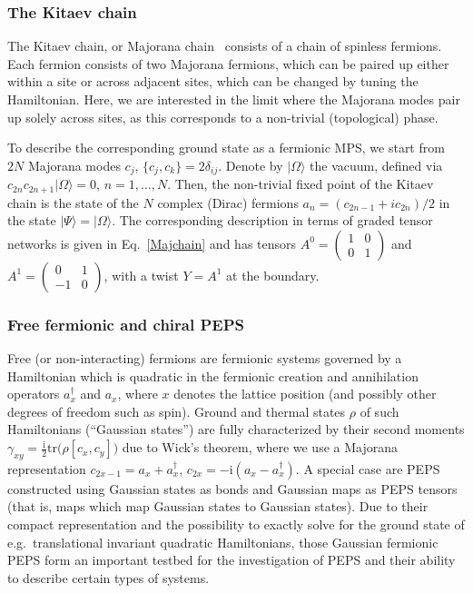 \documentclass[rmp,aps,reprint,superscriptaddress,nobalancelastpage]{revtex4-1}
\newcommand{\ket}[1]{\vert#1\rangle}
\begin{document}
\subsubsection{The Kitaev chain}

The Kitaev chain, or Majorana chain~\cite{kitaev:majorana-chain} consists of a chain of spinless fermions. Each fermion consists of two Majorana fermions, which can be paired up either within a site or across adjacent sites, which can be changed by tuning the Hamiltonian. Here, we are interested in the limit where the Majorana modes pair up solely across sites, as this corresponds to a non-trivial (topological) phase.

To describe the corresponding ground state as a fermionic MPS, we start from $2N$ Majorana modes $c_j$, $\{c_j,c_k\}=2\delta_{ij}$.
Denote by $\ket\Omega$ the vacuum, defined via $c_{2n}c_{2n+1}\ket{\Omega}=0$, $n=1,\dots,N$. Then, the non-trivial fixed point of the Kitaev chain is the state of the $N$ complex (Dirac) fermions $a_n=(c_{2n-1}+ic_{2n})/2$ in the state $\ket\Psi=\ket\Omega$. The corresponding description in terms of graded tensor networks is given in Eq.~\eqref{Majchain} and has tensors \cite{bultinck:fermionic-mps-phases} $A^0=\left(\begin{smallmatrix}1&0\\0&1\end{smallmatrix}\right)$ and
$A^1=\left(\begin{smallmatrix}0&1\\-1&0\end{smallmatrix}\right)$, with a twist $Y=A^1$ at the boundary.



\subsubsection{Free fermionic and chiral PEPS}

Free (or non-interacting) fermions are fermionic systems governed by a Hamiltonian which is quadratic in the fermionic creation and annihilation operators $a^\dagger_x$ and $a_x$, where $x$ denotes the lattice position (and possibly other degrees of freedom such as spin). Ground and thermal states $\rho$ of such Hamiltonians (``Gaussian states'') are fully characterized by their second moments $\gamma_{xy} = \tfrac{\mathrm{i}}{2}\mathrm{tr}\big(\rho [c_x,c_y]\big)$ due to Wick's theorem, where we use a  Majorana representation $c_{2x-1}=a_x+a_x^\dagger$, $c_{2x}=-\mathrm{i}(a_x-a_x^\dagger)$. A special case are PEPS constructed using Gaussian states as bonds and Gaussian maps as PEPS tensors (that is, maps which map Gaussian states to Gaussian states). Due to their compact representation and the possibility to exactly solve for the ground state of e.g.\ translational invariant quadratic Hamiltonians, those Gaussian fermionic PEPS form an important testbed for the investigation of PEPS and their ability to describe certain types of systems.
\end{document}
